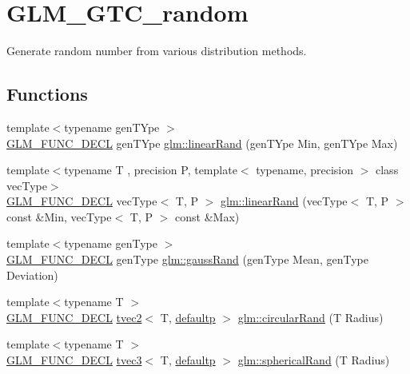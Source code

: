 \hypertarget{group__gtc__random}{}\section{G\+L\+M\+\_\+\+G\+T\+C\+\_\+random}
\label{group__gtc__random}


Generate random number from various distribution methods.  


\subsection*{Functions}
\begin{DoxyCompactItemize}
\item 
{\footnotesize template$<$typename gen\+T\+Ype $>$ }\\\mbox{\hyperlink{setup_8hpp_ab2d052de21a70539923e9bcbf6e83a51}{G\+L\+M\+\_\+\+F\+U\+N\+C\+\_\+\+D\+E\+CL}} gen\+T\+Ype \mbox{\hyperlink{group__gtc__random_ga12aebc19b85a8c736f5801c2f7b9b716}{glm\+::linear\+Rand}} (gen\+T\+Ype Min, gen\+T\+Ype Max)
\item 
{\footnotesize template$<$typename T , precision P, template$<$ typename, precision $>$ class vec\+Type$>$ }\\\mbox{\hyperlink{setup_8hpp_ab2d052de21a70539923e9bcbf6e83a51}{G\+L\+M\+\_\+\+F\+U\+N\+C\+\_\+\+D\+E\+CL}} vec\+Type$<$ T, P $>$ \mbox{\hyperlink{group__gtc__random_gaba9cec867916d894d794a32897b7fdfd}{glm\+::linear\+Rand}} (vec\+Type$<$ T, P $>$ const \&Min, vec\+Type$<$ T, P $>$ const \&Max)
\item 
{\footnotesize template$<$typename gen\+Type $>$ }\\\mbox{\hyperlink{setup_8hpp_ab2d052de21a70539923e9bcbf6e83a51}{G\+L\+M\+\_\+\+F\+U\+N\+C\+\_\+\+D\+E\+CL}} gen\+Type \mbox{\hyperlink{group__gtc__random_ga5193a83e49e4fdc5652c084711083574}{glm\+::gauss\+Rand}} (gen\+Type Mean, gen\+Type Deviation)
\item 
{\footnotesize template$<$typename T $>$ }\\\mbox{\hyperlink{setup_8hpp_ab2d052de21a70539923e9bcbf6e83a51}{G\+L\+M\+\_\+\+F\+U\+N\+C\+\_\+\+D\+E\+CL}} \mbox{\hyperlink{structglm_1_1tvec2}{tvec2}}$<$ T, \mbox{\hyperlink{namespaceglm_a0f04f086094c747d227af4425893f545a9d21ccd8b5a009ec7eb7677befc3bf51}{defaultp}} $>$ \mbox{\hyperlink{group__gtc__random_gae989c26a2899b2fb7444abe7c275c29c}{glm\+::circular\+Rand}} (T Radius)
\item 
{\footnotesize template$<$typename T $>$ }\\\mbox{\hyperlink{setup_8hpp_ab2d052de21a70539923e9bcbf6e83a51}{G\+L\+M\+\_\+\+F\+U\+N\+C\+\_\+\+D\+E\+CL}} \mbox{\hyperlink{structglm_1_1tvec3}{tvec3}}$<$ T, \mbox{\hyperlink{namespaceglm_a0f04f086094c747d227af4425893f545a9d21ccd8b5a009ec7eb7677befc3bf51}{defaultp}} $>$ \mbox{\hyperlink{group__gtc__random_gaa9a6fc2d7a295b3857f7db23b1053d9d}{glm\+::spherical\+Rand}} (T Radius)

\end{DoxyCompactItemize}
